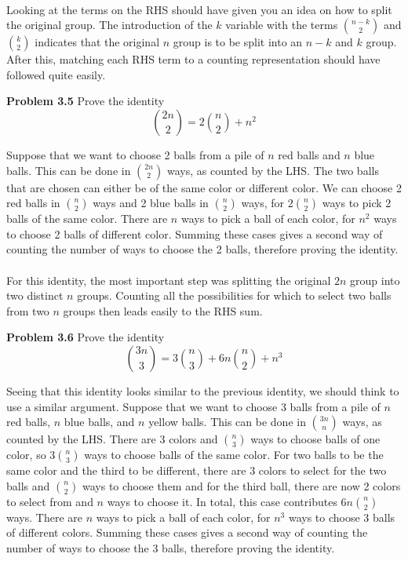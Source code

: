 \documentclass[11pt]{scrartcl}
\begin{document}
\\
\noindent 
Looking at the terms on the RHS should have given you an idea on how to split the original group. The introduction of the $k$ variable with the terms ${n-k} \choose 2$ and $k \choose 2$ indicates that the original $n$ group is to be split into an $n-k$ and $k$ group. After this, matching each RHS term to a counting representation should have followed quite easily.
\\
\begin{tcolorbox}
\textbf{Problem 3.5} Prove the identity
$${{2n \choose 2}}=2{n \choose 2}+n^2$$
\end{tcolorbox}
\noindent 
Suppose that we want to choose 2 balls from a pile of $n$ red balls and $n$ blue balls. This can be done in $2n \choose 2$ ways, as counted by the LHS. The two balls that are chosen can either be of the same color or different color. We can choose 2 red balls in $n \choose 2$ ways and 2 blue balls in $n \choose 2$ ways, for $2{n \choose 2}$ ways to pick 2 balls of the same color. There are $n$ ways to pick a ball of each color, for $n^2$ ways to choose 2 balls of different color. Summing these cases gives a second way of counting the number of ways to choose the 2 balls, therefore proving the identity. \\
\\
\noindent 
For this identity, the most important step was splitting the original $2n$ group into two distinct $n$ groups. Counting all the possibilities for which to select two balls from two $n$ groups then leads easily to the RHS sum. 
\\
\begin{tcolorbox}
\textbf{Problem 3.6} Prove the identity 
$${{3n \choose 3}}=3{n \choose 3}+6n{n \choose 2}+n^3$$
\end{tcolorbox}
\noindent 
Seeing that this identity looks similar to the previous identity, we should think to use a similar argument. Suppose that we want to choose 3 balls from a pile of $n$ red balls, $n$ blue balls, and $n$ yellow balls. This can be done in $3n \choose n$ ways, as counted by the LHS. There are 3 colors and $n \choose 3$ ways to choose balls of one color, so $3{n \choose 3}$ ways to choose balls of the same color. For two balls to be the same color and the third to be different, there are 3 colors to select for the two balls and $n \choose 2$ ways to choose them and for the third ball, there are now 2 colors to select from and $n$ ways to choose it. In total, this case contributes $6n{n \choose 2}$ ways. There are $n$ ways to pick a ball of each color, for $n^3$ ways to choose 3 balls of different colors. Summing these cases gives a second way of counting the number of ways to choose the 3 balls, therefore proving the identity. \\
\end{document}
